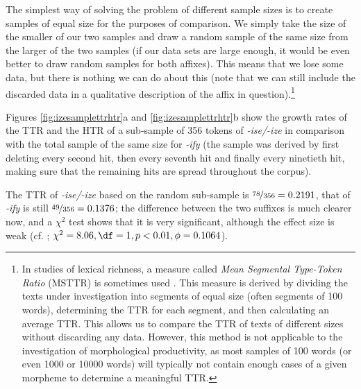 The simplest way of solving the problem of different sample sizes  is to create samples of equal size for the purposes of comparison. We simply take the size of the smaller of our two samples and draw a random sample of the same size from the larger of the two samples (if our data sets are large enough, it would be even better to draw random samples for both affixes).  This means that we lose some data, but there is nothing we can do about this (note that we can still include the discarded data in a qualitative  description  of the affix  in question).\footnote{In studies of lexical richness, a measure called \textit{Mean Segmental Type\hyp{}Token Ratio} (MSTTR)  is sometimes used \citep[cf.][]{johnson_program_1944}. This measure is derived by dividing the texts under investigation into segments of equal size (often segments of 100 words), determining the TTR  for each segment, and then calculating an average TTR. This allows us to compare the TTR of texts of different sizes without discarding any data. However, this method is not applicable to the investigation of morphological  productivity,  as most samples of 100 words (or even 1000 or \num{10000} words) will typically not contain enough cases of a given morpheme to determine a meaningful TTR.}

Figures \ref{fig:izesamplettrhtr}a and \ref{fig:izesamplettrhtr}b show the growth rates of the TTR  and the HTR  of a sub\hyp{}sample of 356 tokens of \textit{-ise/-ize} in comparison with the total sample of the same size for \textit{-ify} (the sample was derived by first deleting every second hit,  then every seventh hit and finally every ninetieth hit, making sure that the remaining hits are spread throughout the corpus).\largerpage[2]

The TTR  of \textit{-ise/-ize} based on the random sub\hyp{}sample is $\nicefrac{78}{356} = 0.2191$, that of \textit{-ify} is still $\nicefrac{49}{356} = 0.1376$; the difference between the two suffixes  is much clearer now, and a $\chi^2$ test shows that it is very significant, although the effect size  is weak (cf. ; $\chi^2 = 8.06, \df = 1, p < 0.01, \phi = 0.1064$).\pagebreak

